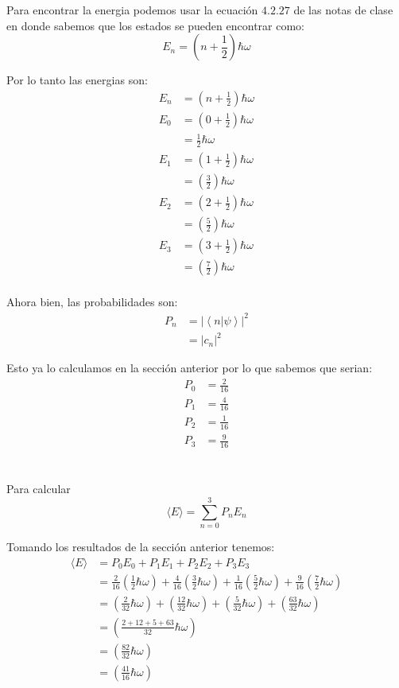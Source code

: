\documentclass{report}
\begin{document}
Para encontrar la energia podemos usar la ecuación $4.2.27$ de las notas de clase en donde sabemos que los estados se pueden encontrar como:
$$
E_{n} = \left(n + \frac{1}{2}\right)\hbar \omega
$$

Por lo tanto las energias son:
\begin{align*}
  E_{n} &= \left(n + \frac{1}{2}\right)\hbar \omega\\
  E_{0} &= \left(0 + \frac{1}{2}\right)\hbar \omega\\
  &= \frac{1}{2}\hbar\omega\\
  E_{1} &= \left(1 + \frac{1}{2}\right)\hbar \omega\\
  &= \left(\frac{3}{2}\right)\hbar \omega\\
  E_{2} &= \left(2 + \frac{1}{2}\right)\hbar \omega\\
  &= \left(\frac{5}{2}\right)\hbar \omega\\
  E_{3} &= \left(3 + \frac{1}{2}\right)\hbar \omega\\
  &= \left(\frac{7}{2}\right)\hbar \omega\\
\end{align*}

Ahora bien, las probabilidades son:
\begin{align*}
  P_n &= \left|\left<n | \psi\right>\right|^2\\
  &= \left|c_n\right|^2
\end{align*}

Esto ya lo calculamos en la sección anterior por lo que sabemos que serian:
\begin{align*}
  P_0 &= \frac{2}{16}\\
  P_1 &= \frac{4}{16}\\
  P_2 &= \frac{1}{16}\\
  P_3 &= \frac{9}{16}
\end{align*}

\section{}

Para calcular
\[
  \langle E \rangle = \sum_{n = 0}^{3} P_n E_n
\]

Tomando los resultados de la sección anterior tenemos:
\begin{align*}
  \langle E \rangle &= P_0E_0 + P_1E_1 + P_2E_2 + P_3E_3\\
  &= \frac{2}{16}\left(\frac{1}{2}\hbar\omega\right) +
  \frac{4}{16}\left(\frac{3}{2}\hbar\omega\right) +
  \frac{1}{16}\left(\frac{5}{2}\hbar\omega\right) +
  \frac{9}{16}\left(\frac{7}{2}\hbar\omega\right)\\
  &= \left(\frac{2}{32}\hbar\omega\right) +
  \left(\frac{12}{32}\hbar\omega\right) +
  \left(\frac{5}{32}\hbar\omega\right) +
  \left(\frac{63}{32}\hbar\omega\right)\\
  &= \left(\frac{2 + 12 + 5 + 63}{32}\hbar\omega\right)\\
  &= \left(\frac{82}{32}\hbar\omega\right)\\
  &= \left(\frac{41}{16}\hbar\omega\right)
\end{align*}
\end{document}
